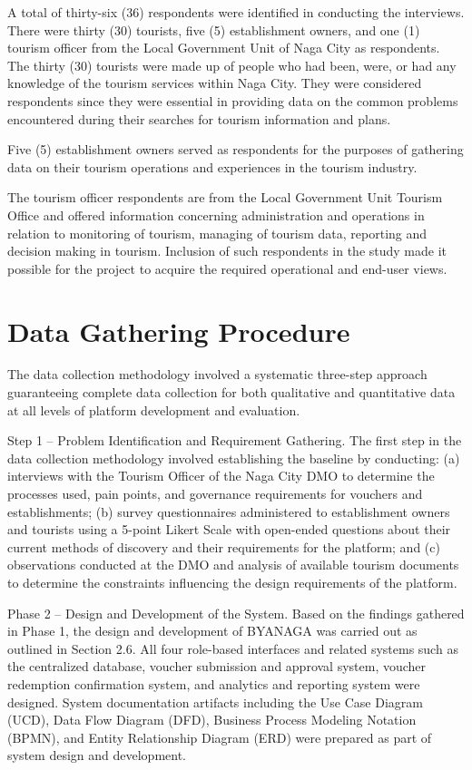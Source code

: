 \documentclass{research}
\begin{document}
A total of thirty-six (36) respondents were identified in conducting the interviews. There were thirty (30) tourists, five (5) establishment owners, and one (1) tourism officer from the Local Government Unit of Naga City as respondents. The thirty (30) tourists were made up of people who had been, were, or had any knowledge of the tourism services within Naga City. They were considered respondents since they were essential in providing data on the common problems encountered during their searches for tourism information and plans.

Five (5) establishment owners served as respondents for the purposes of gathering data on their tourism operations and experiences in the tourism industry.

The tourism officer respondents are from the Local Government Unit Tourism Office and offered information concerning administration and operations in relation to monitoring of tourism, managing of tourism data, reporting and decision making in tourism. Inclusion of such respondents in the study made it possible for the project to acquire the required operational and end-user views.

\section{Data Gathering Procedure}

The data collection methodology involved a systematic three-step approach 
guaranteeing complete data collection for both qualitative and quantitative 
data at all levels of platform development and evaluation.

Step 1 -- Problem Identification and Requirement Gathering. The first step 
in the data collection methodology involved establishing the baseline by 
conducting: (a) interviews with the Tourism Officer of the Naga City DMO to 
determine the processes used, pain points, and governance requirements for 
vouchers and establishments; (b) survey questionnaires administered to 
establishment owners and tourists using a 5-point Likert Scale with 
open-ended questions about their current methods of discovery and their 
requirements for the platform; and (c) observations conducted at the DMO 
and analysis of available tourism documents to determine the constraints 
influencing the design requirements of the platform.

Phase 2 -- Design and Development of the System. Based on the findings 
gathered in Phase 1, the design and development of BYANAGA was carried out 
as outlined in Section 2.6. All four role-based interfaces and related 
systems such as the centralized database, voucher submission and approval 
system, voucher redemption confirmation system, and analytics and reporting 
system were designed. System documentation artifacts including the Use Case 
Diagram (UCD), Data Flow Diagram (DFD), Business Process Modeling Notation 
(BPMN), and Entity Relationship Diagram (ERD) were prepared as part of 
system design and development.
\end{document}
